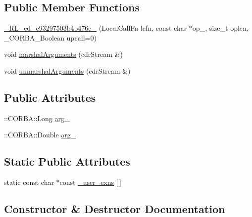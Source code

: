 \subsection*{Public Member Functions}
\begin{DoxyCompactItemize}
\item 
\hyperlink{class__0_r_l__cd__c93297503b4b476c__30000000_ae181c7b1d7848e49c70a52073b061400}{\+\_\+R\+L\+\_\+cd\+\_\+c93297503b4b476c\+\_} (Local\+Call\+Fn lcfn, const char $\ast$op\+\_\+, size\+\_\+t oplen, \+\_\+\+C\+O\+R\+B\+A\+\_\+\+Boolean upcall=0)
\item 
void \hyperlink{class__0_r_l__cd__c93297503b4b476c__30000000_a5acf7bd554776e260310ff9b60a28cc9}{marshal\+Arguments} (cdr\+Stream \&)
\item 
void \hyperlink{class__0_r_l__cd__c93297503b4b476c__30000000_a54388faf34b2345e350f1948e61fa147}{unmarshal\+Arguments} (cdr\+Stream \&)
\end{DoxyCompactItemize}
\subsection*{Public Attributes}
\begin{DoxyCompactItemize}
\item 
\+::C\+O\+R\+B\+A\+::\+Long \hyperlink{class__0_r_l__cd__c93297503b4b476c__30000000_a508ca8a434376dd8600660a60e41d84d}{arg\+\_}
\item 
\+::C\+O\+R\+B\+A\+::\+Double \hyperlink{class__0_r_l__cd__c93297503b4b476c__30000000_a84a569f3464f78e8a47f0c154dd7e164}{arg\+\_}
\end{DoxyCompactItemize}
\subsection*{Static Public Attributes}
\begin{DoxyCompactItemize}
\item 
static const char $\ast$const \hyperlink{class__0_r_l__cd__c93297503b4b476c__30000000_a49bdb6f8215069d7d5e9d5b93ab33cf5}{\+\_\+user\+\_\+exns} \mbox{[}$\,$\mbox{]}
\end{DoxyCompactItemize}


\subsection{Constructor \& Destructor Documentation}
